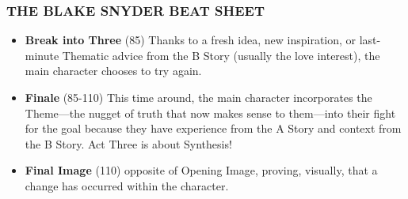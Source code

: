 \documentclass{beamer}
\begin{document}
\begin{frame}\frametitle{THE BLAKE SNYDER BEAT SHEET}
\begin{itemize}
\item {\bf Break into Three} (85) Thanks to a fresh idea, new inspiration,
  or last-minute Thematic advice from the B Story (usually the love
  interest), the main character chooses to try again. 
\item {\bf Finale} (85-110) This time around, the main character
  incorporates the Theme---the nugget of truth that now makes sense to
  them---into their fight for the goal because they have experience
  from the A Story and context from the B Story. Act Three is about
  Synthesis! 
\item {\bf Final Image} (110)  opposite of Opening Image, proving, visually,
  that a change has occurred within the character. 
\end{itemize}
\end{frame}
\end{document}
